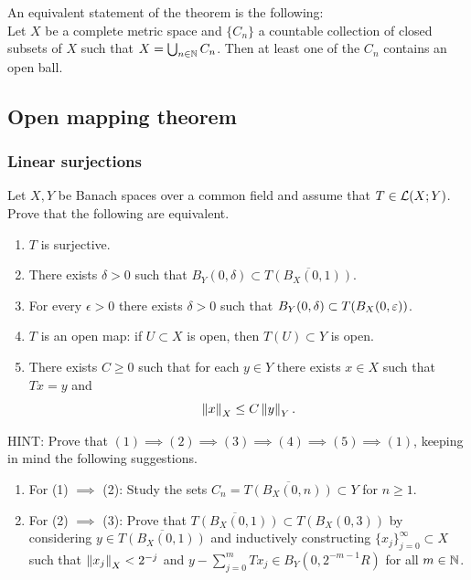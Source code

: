 \documentclass[a4paper]{article}
\begin{document}
\begin{remark}
    An equivalent statement of the theorem is the following: \\
    Let $X$ be a complete metric space and $\{C_n\}$ a countable 
    collection of closed subsets of $X$ such that $X = 
    \bigcup_{n \in \mathbb{N}} C_n $. Then at least one of the $C_n$ 
    contains an open ball.
\end{remark}

\subsection{Open mapping theorem}

\subsubsection*{Linear surjections}

\begin{thm}
Let $X,Y$ be Banach spaces over a common field and assume that 
$T \in \mathcal{L}(X;Y)$.  Prove that the following are equivalent.
\begin{enumerate}
 \item $T$ is surjective.
 
 \item There exists $\delta >0$ such that $B_Y(0,\delta) \subset 
 \overline{T(B_X(0,1))}$.
 
 \item For every $\epsilon >0$ there exists $\delta >0$ 
 such that $B_Y(0,\delta) \subset T(B_X(0,\varepsilon))$.
 
 \item $T$ is an open map: if $U\subset X$ is open, then 
 $T(U) \subset Y$ is open.

  \item There exists $C \ge 0$ such that for each $y \in Y$ 
  there exists $x \in X$ such that $Tx=y$ and 
\begin{equation*}
 \left\lVert x\right\rVert_X \le C \left\lVert y\right\rVert_Y.
\end{equation*}
\end{enumerate}
HINT: Prove that  $(1) \implies (2) \implies (3) 
\implies (4) \implies (5)  \implies (1)$, keeping 
in mind the following suggestions.  
\begin{enumerate}
 \item For (1) $\implies$ (2): Study the sets $C_n = 
 \overline{T(B_X(0,n))} \subset Y$ for $n \ge 1$.
 \item For (2) $\implies$ (3):  Prove that 
 $\overline{T(B_X(0,1)  )} \subset T(B_X(0,3))$ 
 by considering $y \in\overline{T(B_X(0,1)  )}$ and  
 inductively constructing $\{x_j\}_{j=0}^\infty \subset X$
such that $\left\lVert x_j\right\rVert_X < 2^{-j}$ and 
$y - \sum_{j=0}^m T x_j \in B_Y(0,2^{-m-1} R)$  
for all $m \in \mathbb{N}$.
\end{enumerate}
\end{thm}
\end{document}

